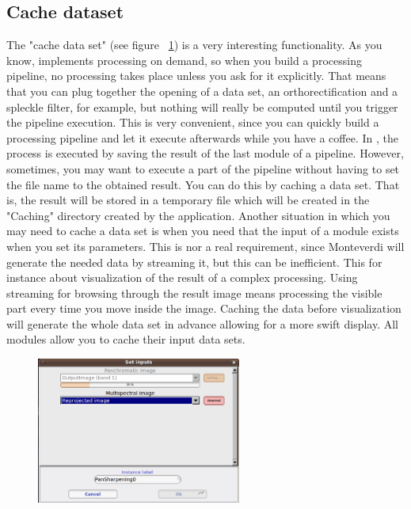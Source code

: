 \subsection{Cache dataset}
The "cache data set" (see figure ~\ref{fig:cachingmodule}) is a very
interesting functionality. As you know, \otb implements processing on
demand, so when you build a processing pipeline, no processing takes
place unless you ask for it explicitly. That means that you can plug
together the opening of a data set, an orthorectification and a
spleckle filter, for example, but nothing will really be computed
until you trigger the pipeline execution. This is very convenient,
since you can quickly build a processing pipeline and let it execute
afterwards while you have a coffee. In \mont, the process is executed
by saving the result of the last module of a pipeline. However,
sometimes, you may want to execute a part of the pipeline without
having to set the file name to the obtained result. You can do this by
caching a data set. That is, the result will be stored in a temporary
file which will be created in the "Caching" directory created by the
application. Another situation in which you may need to cache a data
set is when you need that the input of a module exists when you set
its parameters. This is nor a real requirement, since Monteverdi will
generate the needed data by streaming it, but this can be
inefficient. This for instance about visualization of the result of a
complex processing. Using streaming for browsing through the result
image means processing the visible part every time you move inside the
image. Caching the data before visualization will generate the whole
data set in advance allowing for a more swift display. All modules
allow you to cache their input data sets.

\begin{figure}
  \center
  \includegraphics[width=0.6\textwidth]{../Art/MonteverdiImages/monteverdi_caching_module.png}
  \label{fig:cachingmodule}
\end{figure}

